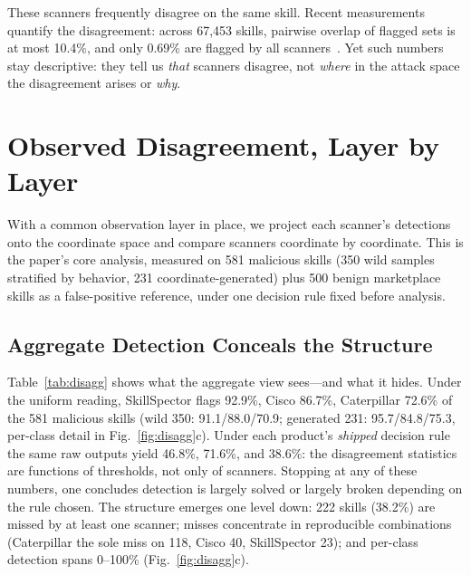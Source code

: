 \documentclass[sigconf,nonacm]{acmart}
\begin{document}
These scanners frequently disagree on the same skill. Recent measurements quantify the disagreement: across 67{,}453 skills, pairwise overlap of flagged sets is at most 10.4\%, and only 0.69\% are flagged by all scanners~\cite{clawhub2026}. Yet such numbers stay descriptive: they tell us \emph{that} scanners disagree, not \emph{where} in the attack space the disagreement arises or \emph{why}.

\section{Observed Disagreement, Layer by Layer}
\label{sec:explain}

With a common observation layer in place, we project each scanner's detections onto the coordinate space and compare scanners coordinate by coordinate. This is the paper's core analysis, measured on 581 malicious skills (350 wild samples stratified by behavior, 231 coordinate-generated) plus 500 benign marketplace skills as a false-positive reference, under one decision rule fixed before analysis.

\subsection{Aggregate Detection Conceals the Structure}
Table~\ref{tab:disagg} shows what the aggregate view sees---and what it hides. Under the uniform reading, SkillSpector flags 92.9\%, Cisco 86.7\%, Caterpillar 72.6\% of the 581 malicious skills (wild 350: 91.1/88.0/70.9; generated 231: 95.7/84.8/75.3, per-class detail in Fig.~\ref{fig:disagg}c). Under each product's \emph{shipped} decision rule the same raw outputs yield 46.8\%, 71.6\%, and 38.6\%: the disagreement statistics are functions of thresholds, not only of scanners. Stopping at any of these numbers, one concludes detection is largely solved or largely broken depending on the rule chosen. The structure emerges one level down: 222 skills (38.2\%) are missed by at least one scanner; misses concentrate in reproducible combinations (Caterpillar the sole miss on 118, Cisco 40, SkillSpector 23); and per-class detection spans 0--100\% (Fig.~\ref{fig:disagg}c).
\end{document}
